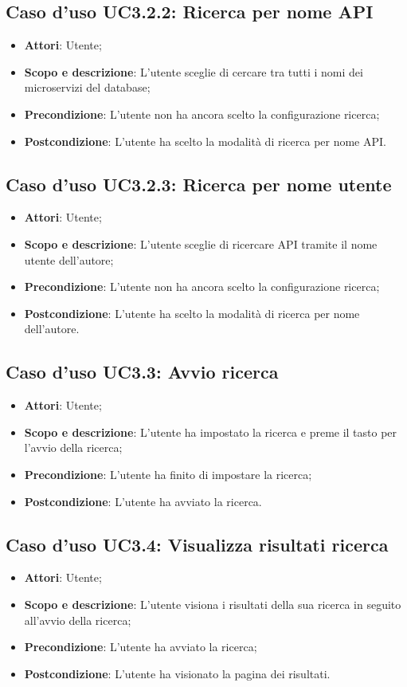 \documentclass[12pt,a4paper,titlepage]{article}
\begin{document}
	\subsection{Caso d'uso UC3.2.2: Ricerca per nome API}
	\label{UC3.2.2}
	\begin{itemize}
		\item \textbf{Attori}: Utente;
		\item \textbf{Scopo e descrizione}: L'utente sceglie di cercare tra tutti i nomi dei microservizi del database;
		\item \textbf{Precondizione}: L'utente non ha ancora scelto la configurazione ricerca;
		\item \textbf{Postcondizione}: L'utente ha scelto la modalità di ricerca per nome API.
	\end{itemize}
	\subsection{Caso d'uso UC3.2.3: Ricerca per nome utente}
	\label{UC3.2.3}
	\begin{itemize}
		\item \textbf{Attori}: Utente;
		\item \textbf{Scopo e descrizione}: L'utente sceglie di ricercare API tramite il nome utente dell'autore;
		\item \textbf{Precondizione}: L'utente non ha ancora scelto la configurazione ricerca;
		\item \textbf{Postcondizione}: L'utente ha scelto la modalità di ricerca per nome dell'autore.
	\end{itemize}
	\subsection{Caso d'uso UC3.3: Avvio ricerca}
	\label{UC3.3}
	\begin{itemize}
		\item \textbf{Attori}: Utente;
		\item \textbf{Scopo e descrizione}: L'utente ha impostato la ricerca e preme il tasto per l'avvio della ricerca;
		\item \textbf{Precondizione}: L'utente ha finito di impostare la ricerca;
		\item \textbf{Postcondizione}: L'utente ha avviato la ricerca.
	\end{itemize}
	\subsection{Caso d'uso UC3.4: Visualizza risultati ricerca}
	\label{UC3.4}
	\begin{itemize}
		\item \textbf{Attori}: Utente;
		\item \textbf{Scopo e descrizione}: L'utente visiona i risultati della sua ricerca in seguito all'avvio della ricerca;
		\item \textbf{Precondizione}: L'utente ha avviato la ricerca;
		\item \textbf{Postcondizione}: L'utente ha visionato la pagina dei risultati.
	\end{itemize}
\end{document}
